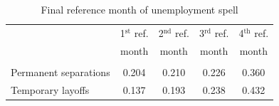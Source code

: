 \documentclass[12pt]{article}
\begin{document}
    \begin{table}
      \caption{Final reference month of unemployment spell}
      \begin{center}
  \begin{tabular}{l|cccc}
    & \multicolumn{1}{c}{1$^\text{st}$ ref.}
    & \multicolumn{1}{c}{2$^\text{nd}$ ref.}
    & \multicolumn{1}{c}{3$^\text{rd}$ ref.}
    & \multicolumn{1}{c}{4$^\text{th}$ ref.} \\
    & \multicolumn{1}{c}{month}
    & \multicolumn{1}{c}{month}
    & \multicolumn{1}{c}{month}
    & \multicolumn{1}{c}{month} \\ \hline \\[-1em]
    Permanent separations & 0.204 &  0.210 &  
    0.226 &   0.360 \\[.35em]
    Temporary layoffs     & 0.137 &  0.193 &  
    0.238 &   0.432 \\[.35em]
    \hline
  \end{tabular}
      \end{center}
    \end{table}
\end{document}
